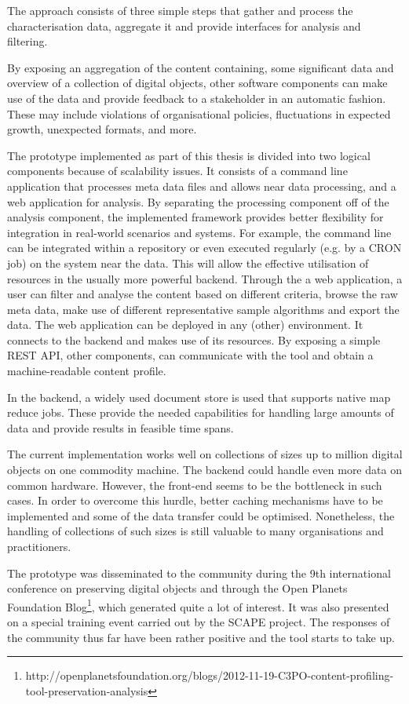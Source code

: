 The approach consists of three simple steps that gather and process the characterisation data, aggregate it and provide
interfaces for analysis and filtering. 

By exposing an aggregation of the content containing, some significant data and overview of a collection of digital objects, other software components can make use of the data and provide feedback to a stakeholder in an automatic fashion. 
These may include violations of organisational policies, fluctuations in expected growth, unexpected formats, and more.

The prototype implemented as part of this thesis is divided into two logical components because of scalability issues. It consists of a command line application that processes meta data files and allows near data processing, and a web application for analysis.
By separating the processing component off of the analysis component, the implemented framework provides
better flexibility for integration in real-world scenarios and systems. For example, the command line can be integrated within a repository or even executed regularly (e.g. by a CRON job) on the system near the data. This will allow the effective utilisation of resources in the usually more powerful backend.
Through the a web application, a user can filter and analyse the content based on different criteria, browse the raw meta data, make use of different representative sample algorithms and export the data. The web application can be deployed in any (other) environment. It connects to the backend and makes use of its resources. By exposing a simple REST API, other components, can communicate with the tool and obtain a machine-readable content profile.
 
In the backend, a widely used document store is used that supports native map reduce jobs. These provide the needed capabilities for handling large amounts of data and provide results in feasible time spans.

The current implementation works well on collections of sizes up to million digital objects on one commodity machine. The backend could handle even more data on common hardware. However, the front-end seems to be the bottleneck in such cases. In order to overcome this hurdle, better caching mechanisms have to be implemented and some of the data transfer could be optimised.
Nonetheless, the handling of collections of such sizes is still valuable to many organisations and practitioners.

The prototype was disseminated to the community during the 9th international conference on preserving digital objects \cite{petrov-ipres2012} and through the Open Planets Foundation Blog\footnote{http://openplanetsfoundation.org/blogs/2012-11-19-C3PO-content-profiling-tool-preservation-analysis}, which generated quite a lot of interest. It was also presented on a special training event carried out by the SCAPE project. The responses of the community thus far have been rather positive and the tool starts to take up.  

